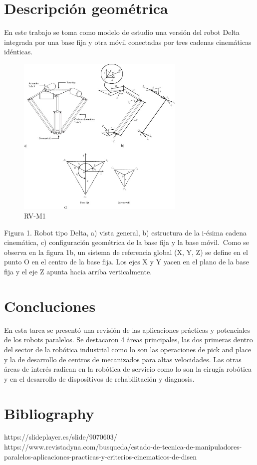 \documentclass[letter,openright,12pt,spanish]{report}
\begin{document}
\section{Descripción geométrica}
En este trabajo se toma como modelo de estudio una versión del robot Delta integrada por una base fija y otra móvil conectadas por tres cadenas cinemáticas idénticas.\

\begin{figure}[htp]
\centering
\includegraphics[width=8cm]{1.jpg}
\caption{RV-M1}
\label{Figura 1}
\end{figure}

Figura 1. Robot tipo Delta, a) vista general, b) estructura de la i-ésima cadena cinemática, c) configuración geométrica de la base fija y la base móvil.\
Como se observa en la figura 1b, un sistema de referencia global (X, Y, Z) se define en el punto O en el centro de la base fija. Los ejes X y Y yacen en el plano de la base fija y el eje Z apunta hacia arriba verticalmente. \
\section{Concluciones}
En esta tarea se presentó una revisión de las aplicaciones prácticas y potenciales de los robots
paralelos. Se destacaron 4 áreas principales, las dos primeras dentro del sector de la robótica industrial
como lo son las operaciones de pick and place y la de desarrollo de centros de mecanizados para altas
velocidades. Las otras áreas de interés radican en la robótica de servicio como lo son la cirugía robótica
y en el desarrollo de dispositivos de rehabilitación y diagnosis. 
\section{Bibliography}
https://slideplayer.es/slide/9070603/ \\
https://www.revistadyna.com/busqueda/estado-de-tecnica-de-manipuladores-paralelos-aplicaciones-practicas-y-criterios-cinematicos-de-disen \\
\end{document}
